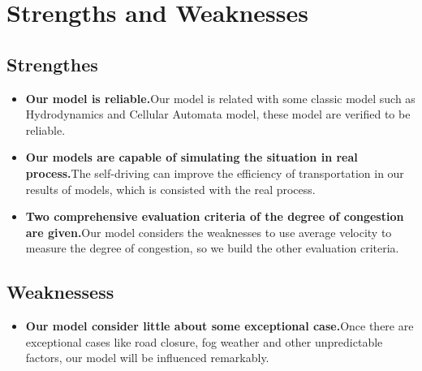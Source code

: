 \documentclass{mcmthesis}
\begin{document}
\section{Strengths and Weaknesses}
\subsection{Strengthes}
\begin{itemize}
\item{\textbf{Our model is reliable.}Our model is related with some classic model such as Hydrodynamics and Cellular Automata model, these model are verified to be reliable.}
\end{itemize}
\begin{itemize}
\item{\textbf{Our models are capable of simulating the situation in real process.}The self-driving can improve the efficiency of transportation in our results of models, which is consisted with the real process.}
\end{itemize}
\begin{itemize}
\item{\textbf{Two comprehensive evaluation criteria of the degree of congestion are given.}Our model considers the weaknesses to use average velocity to measure the degree of congestion, so we build the other evaluation criteria.}
\end{itemize}

\subsection{Weaknessess}

\begin{itemize}
\item{\textbf{Our model consider little about some exceptional case.}Once there are exceptional cases like road closure, fog weather and other unpredictable factors, our model will be influenced remarkably.}
\end{itemize}
\newpage
\end{document}
